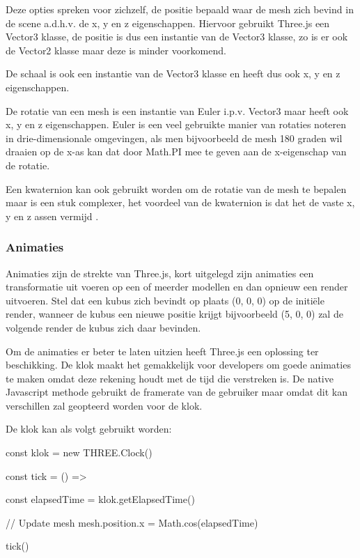 Deze opties spreken voor zichzelf, de positie bepaald waar de mesh zich bevind in de scene a.d.h.v. de x, y en z eigenschappen. Hiervoor gebruikt Three.js een Vector3 klasse, de positie is dus een instantie van de Vector3 klasse, zo is er ook de Vector2 klasse maar deze is minder voorkomend.

De schaal is ook een instantie van de Vector3 klasse en heeft dus ook x, y en z eigenschappen.

De rotatie van een mesh is een instantie van Euler i.p.v. Vector3 maar heeft ook x, y en z eigenschappen. Euler is een veel gebruikte manier van rotaties noteren in drie-dimensionale omgevingen, als men bijvoorbeeld de mesh 180 graden wil draaien op de x-as kan dat door Math.PI mee te geven aan de x-eigenschap van de rotatie.

Een kwaternion kan ook gebruikt worden om de rotatie van de mesh te bepalen maar is een stuk complexer, het voordeel van de kwaternion is dat het de vaste x, y en z assen vermijd \autocite{Simon2023}.

\subsubsection{Animaties}

Animaties zijn de strekte van Three.js, kort uitgelegd zijn animaties een transformatie uit voeren op een of meerder modellen en dan opnieuw een render uitvoeren. Stel dat een kubus zich bevindt op plaats (0, 0, 0) op de initiële render, wanneer de kubus een nieuwe positie krijgt bijvoorbeeld (5, 0, 0) zal de volgende render de kubus zich daar bevinden. 

Om de animaties er beter te laten uitzien heeft Three.js een oplossing ter beschikking. De klok maakt het gemakkelijk voor developers om goede animaties te maken omdat deze rekening houdt met de tijd die verstreken is. De native Javascript methode gebruikt de framerate van de gebruiker maar omdat dit kan verschillen zal geopteerd worden voor de klok.

De klok kan als volgt gebruikt worden:

\begin{LVerbatim}
const klok = new THREE.Clock()

const tick = () =>
{
	const elapsedTime = klok.getElapsedTime()
	
	// Update mesh
	mesh.position.x = Math.cos(elapsedTime)
}

tick()
\end{LVerbatim}

